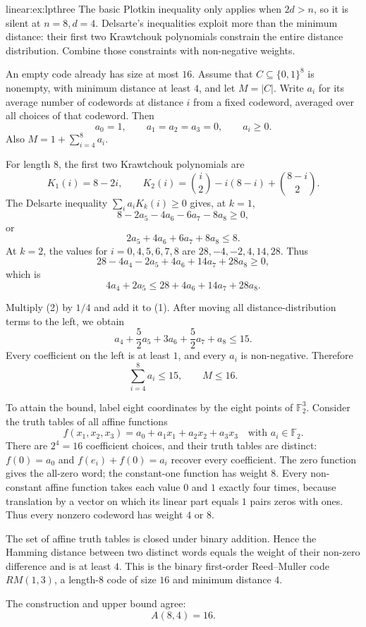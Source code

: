 \begin{solution}{linear:ex:lpthree}
\idea The basic Plotkin inequality only applies when $2d>n$, so it is silent at $n=8,d=4$. Delsarte's inequalities exploit more than the minimum distance: their first two Krawtchouk polynomials constrain the entire distance distribution. Combine those constraints with non-negative weights.

\writeup An empty code already has size at most $16$. Assume that
$C\subseteq\{0,1\}^8$ is nonempty, with minimum distance at least $4$,
and let $M=|C|$. Write $a_i$ for its average number of codewords at distance $i$ from a fixed codeword, averaged over all choices of that codeword. Then
\[
a_0=1,\qquad a_1=a_2=a_3=0,\qquad a_i\ge0.
\]
Also $M=1+\sum_{i=4}^8a_i$.

For length $8$, the first two Krawtchouk polynomials are
\[
K_1(i)=8-2i,\qquad
K_2(i)=\binom i2-i(8-i)+\binom{8-i}2.
\]
The Delsarte inequality $\sum_i a_iK_k(i)\ge0$ gives, at $k=1$,
\[
8-2a_5-4a_6-6a_7-8a_8\ge0,
\]
or
\[
2a_5+4a_6+6a_7+8a_8\le8. \tag{1}
\]
At $k=2$, the values for $i=0,4,5,6,7,8$ are $28,-4,-2,4,14,28$. Thus
\[
28-4a_4-2a_5+4a_6+14a_7+28a_8\ge0,
\]
which is
\[
4a_4+2a_5\le28+4a_6+14a_7+28a_8. \tag{2}
\]

Multiply (2) by $1/4$ and add it to (1). After moving all distance-distribution terms to the left, we obtain
\[
a_4+\frac52a_5+3a_6+\frac52a_7+a_8\le15.
\]
Every coefficient on the left is at least $1$, and every $a_i$ is non-negative. Therefore
\[
\sum_{i=4}^8a_i\le15,\qquad
\boxed{M\le16}.
\]

To attain the bound, label eight coordinates by the eight points of $\mathbb F_2^3$. Consider the truth tables of all affine functions
\[
f(x_1,x_2,x_3)=a_0+a_1x_1+a_2x_2+a_3x_3
\quad\text{with }a_i\in\mathbb F_2.
\]
There are $2^4=16$ coefficient choices, and their truth tables are distinct:
$f(0)=a_0$ and $f(e_i)+f(0)=a_i$ recover every coefficient.
The zero function gives the all-zero word; the constant-one function has weight $8$. Every non-constant affine function takes each value $0$ and $1$ exactly four times, because translation by a vector on which its linear part equals $1$ pairs zeros with ones. Thus every nonzero codeword has weight $4$ or $8$.

The set of affine truth tables is closed under binary addition. Hence the Hamming distance between two distinct words equals the weight of their non-zero difference and is at least $4$. This is the binary first-order Reed--Muller code $RM(1,3)$, a length-$8$ code of size $16$ and minimum distance $4$.

The construction and upper bound agree:
\[
\boxed{A(8,4)=16}.
\]
\end{solution}

